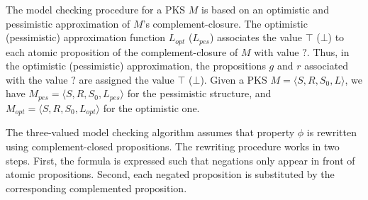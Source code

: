 %

The model checking procedure for a PKS $M$ is based on an optimistic and pessimistic approximation of $M$'s complement-closure.
The optimistic (pessimistic) approximation function $L_{opt}$  ($L_{pes}$) associates the value $\top$ ($\bot$) to each atomic proposition of the complement-closure of $M$ with value $?$.
Thus, in the optimistic (pessimistic) approximation, the propositions $g$ and $r$ associated with the value $?$ are assigned the value $\top$ ($\bot$).
Given a PKS $M=\langle S,R, S_0, L \rangle$, we have $M_{pes}=\langle S,R, S_0, L_{pes} \rangle$ for the pessimistic structure, and $M_{opt}=\langle S,R, S_0, L_{opt} \rangle$ for the optimistic one.
%

The three-valued model checking algorithm assumes that property $\phi$ is rewritten using complement-closed propositions. 
The rewriting procedure works in two steps.
First, the formula is expressed such that negations only appear in front of atomic propositions. 
Second, each negated proposition is substituted by the corresponding complemented proposition.


